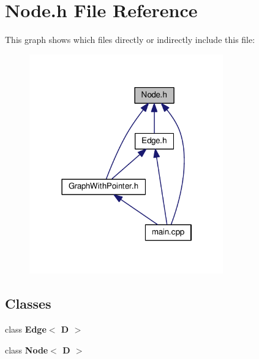 \section{Node.\-h File Reference}
\label{_node_8h}
This graph shows which files directly or indirectly include this file\-:
\nopagebreak
\begin{figure}[H]
\begin{center}
\leavevmode
\includegraphics[width=237pt]{_node_8h__dep__incl}
\end{center}
\end{figure}
\subsection*{Classes}
\begin{DoxyCompactItemize}
\item 
class {\bf Edge$<$ D $>$}
\item 
class {\bf Node$<$ D $>$}
\end{DoxyCompactItemize}
